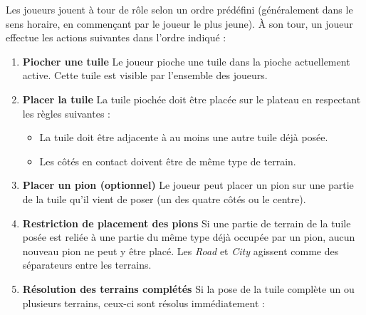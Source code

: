 \documentclass[a4paper]{article}
\begin{document}
Les joueurs jouent à tour de rôle selon un ordre prédéfini (généralement dans le sens horaire, en commençant par le joueur le plus jeune).  
À son tour, un joueur effectue les actions suivantes dans l’ordre indiqué :

\begin{enumerate}
  \item \textbf{Piocher une tuile}  
  Le joueur pioche une tuile dans la pioche actuellement active. Cette tuile est visible par l’ensemble des joueurs.

  \item \textbf{Placer la tuile}  
  La tuile piochée doit être placée sur le plateau en respectant les règles suivantes :
  \begin{itemize}
    \item[-] La tuile doit être adjacente à au moins une autre tuile déjà posée.
    \item[-] Les côtés en contact doivent être de même type de terrain.
  \end{itemize}

  \item \textbf{Placer un pion (optionnel)}  
  Le joueur peut placer un pion sur une partie de la tuile qu’il vient de poser (un des quatre côtés ou le centre).

  \item \textbf{Restriction de placement des pions}  
  Si une partie de terrain de la tuile posée est reliée à une partie du même type déjà occupée par un pion, aucun nouveau pion ne peut y être placé.  
  Les \textit{Road} et \textit{City} agissent comme des séparateurs entre les terrains.

  \item \textbf{Résolution des terrains complétés}  
  Si la pose de la tuile complète un ou plusieurs terrains, ceux-ci sont résolus immédiatement :
\end{enumerate}
\end{document}
